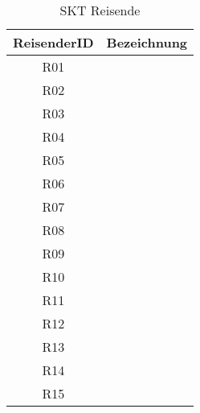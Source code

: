%
\begin{table}[ht]
\centering
\begin{tabular}{|c|c|}
\hline
ReisenderID&Bezeichnung\\
\hline
R01&\\
\hline
R02&\\
\hline
R03&\\
\hline
R04&\\
\hline
R05&\\
\hline
R06&\\
\hline
R07&\\
\hline
R08&\\
\hline
R09&\\
\hline
R10&\\
\hline
R11&\\
\hline
R12&\\
\hline
R13&\\
\hline
R14&\\
\hline
R15&\\
\hline
\end{tabular}
\caption{SKT Reisende}
\label{tab:SKTReisende}
\end{table}
